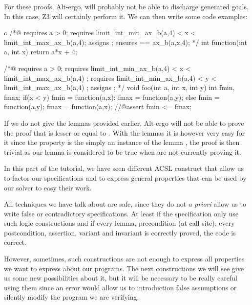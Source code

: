 \documentclass[middle]{zmdocument}
\begin{document}
For these proofs, Alt-ergo, will probably not be able to discharge
generated goals. In this case, Z3 will certainly perform it. We can then
write some code examples:



\begin{CodeBlock}{c}
/*@
  requires a > 0;
  requires limit_int_min_ax_b(a,4) < x < limit_int_max_ax_b(a,4);
  assigns \nothing ;
  ensures \result == ax_b(a,x,4);
*/
int function(int a, int x){
  return a*x + 4;
}

/*@ 
  requires a > 0;
  requires limit_int_min_ax_b(a,4) < x < limit_int_max_ax_b(a,4) ;
  requires limit_int_min_ax_b(a,4) < y < limit_int_max_ax_b(a,4) ;
  assigns \nothing ;
*/
void foo(int a, int x, int y){
  int fmin, fmax;
  if(x < y){
    fmin = function(a,x);
    fmax = function(a,y);
  } else {
    fmin = function(a,y);
    fmax = function(a,x);
  }
  //@assert fmin <= fmax;
}
\end{CodeBlock}



If we do not give the lemmas provided earlier, Alt-ergo will not be able
to prove the proof that  is lesser or equal to
. With the lemmas it is however very easy for it since the
property is the simply an instance of the lemma
, the proof is then trivial as our lemma is
considered to be true when are not currently proving it.

\horizontalLine

In this part of the tutorial, we have seen different ACSL construct that
allow us to factor our specifications and to express general properties
that can be used by our solver to easy their work.




All techniques we have talk about are safe, since they do not \emph{a
priori} allow us to write false or contradictory specifications. At
least if the specification only use such logic constructions and if
every lemma, precondition (at call site), every postcondition,
assertion, variant and invariant is correctly proved, the code is
correct.




However, sometimes, such constructions are not enough to express all
properties we want to express about our programs. The next constructions
we will see give us some new possibilities about it, but it will be
necessary to be really careful using them since an error would allow us
to introduction false assumptions or silently modify the program we are
verifying.
\end{document}
